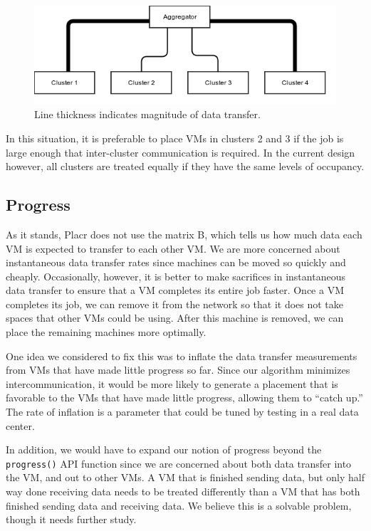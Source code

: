 \documentclass[11pt]{article}
\begin{document}
\begin{figure}
  \centering
\includegraphics[scale=0.7]{cluster_congestion.png}

 \caption{Line thickness indicates magnitude of data transfer.}

 \label{fig:cluster_congestion}
 
\end{figure}
 
 In this situation, it is preferable to place VMs in clusters 2 and 3 if the job is large enough that inter-cluster communication is required.  In the current design however, all clusters are treated equally if they have the same levels of occupancy.
 
\subsection{Progress}

As it stands, Placr does not use the matrix B, which tells us how much data each VM is expected to transfer to each other VM. We are more concerned about instantaneous data transfer rates since machines can be moved so quickly and cheaply.  Occasionally, however, it is better to make sacrifices in instantaneous data transfer to ensure that a VM completes its entire job faster.  Once a VM completes its job, we can remove it from the network so that it does not take spaces that other VMs could be using.  After this machine is removed, we can place the remaining machines more optimally.

One idea we considered to fix this was to inflate the data transfer measurements from VMs that have made little progress so far.  Since our algorithm minimizes intercommunication, it would be more likely to generate a placement that is favorable to the VMs that have made little progress, allowing them to ``catch up.''  The rate of inflation is a parameter that could be tuned by testing in a real data center.

In addition, we would have to expand our notion of progress beyond the \texttt{progress()} API function since we are concerned about both data transfer into the VM, and out to other VMs.  A VM that is finished sending data, but only half way done receiving data needs to be treated differently than a VM that has both finished sending data and receiving data.  We believe this is a solvable problem, though it needs further study.
\end{document}
